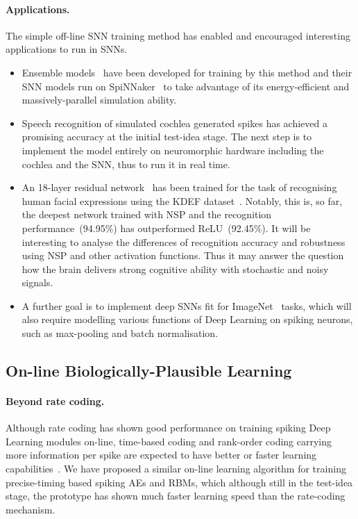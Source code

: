 \paragraph{Applications.}
The simple off-line SNN training method has enabled and encouraged interesting applications to run in SNNs.

\begin{itemize}
	\item Ensemble models~\citep{rokach2010ensemble} have been developed for training by this method and their SNN models run on SpiNNaker~\citep{furber2014spinnaker} to take advantage of its energy-efficient and massively-parallel simulation ability.
	\item Speech recognition of simulated cochlea generated spikes has achieved a promising accuracy at the initial test-idea stage.
	The next step is to implement the model entirely on neuromorphic hardware including the cochlea and the SNN, thus to run it in real time.
	\item An 18-layer residual network~\citep{he2016deep} has been trained for the task of recognising human facial expressions using the KDEF dataset~\citep{lundqvist1998karolinska}.
	Notably, this is, so far, the deepest network trained with NSP and the recognition performance~(94.95\%) has outperformed ReLU~(92.45\%).
	It will be interesting to analyse the differences of recognition accuracy and robustness using NSP and other activation functions.
	Thus it may answer the question how the brain delivers strong cognitive ability with stochastic and noisy signals.
 	\item A further goal is to implement deep SNNs fit for ImageNet~\citep{deng2009imagenet} tasks, which will also require modelling various functions of Deep Learning on spiking neurons, such as max-pooling and batch normalisation. 

\end{itemize}


\subsection{On-line Biologically-Plausible Learning}
\paragraph{Beyond rate coding.}
Although rate coding has shown good performance on training spiking Deep Learning modules on-line, time-based coding and rank-order coding carrying more information per spike are expected to have better or faster learning capabilities~\citep{gautrais1998rate}.
We have proposed a similar on-line learning algorithm for training precise-timing based spiking AEs and RBMs, which although still in the test-idea stage, the prototype has shown much faster learning speed than the rate-coding mechanism.

